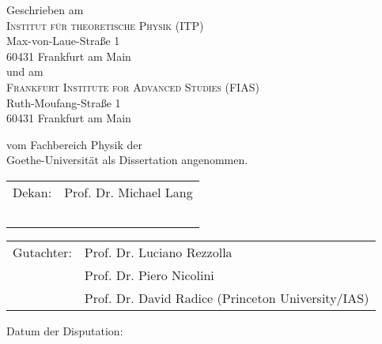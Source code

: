 	\noindent
	Geschrieben am \\[.3cm]
	
	\noindent
	\textsc{Institut für theoretische Physik (ITP)} \\
	Max-von-Laue-Straße 1 \\
	60431 Frankfurt am Main \\[.3cm]
	
	\noindent
	und am \\[.3cm]
	
	\noindent
	\textsc{Frankfurt Institute for Advanced Studies (FIAS)} \\
	Ruth-Moufang-Straße 1 \\
	60431 Frankfurt am Main
	
	\vfill
	
	\noindent{}%
	vom Fachbereich Physik der \\[2pt]
	Goethe-Universit\"at als Dissertation angenommen.
	
	\vspace*{2cm}
	
	\noindent{}%
	\begin{tabular}{@{}l@{\hskip 1ex}l}
		Dekan: & Prof. Dr. Michael Lang\\
		\phantom{Gutachter:}&~
	\end{tabular}
	
	
	\noindent{}%
	\begin{tabular}{@{}l@{\hskip 1ex}l}
		Gutachter: & Prof. Dr. Luciano Rezzolla\\
		& Prof. Dr. Piero Nicolini \\
		& Prof. Dr. David Radice (Princeton University/IAS)
	\end{tabular}
	
	\vspace*{2cm}
	\noindent{}%
	Datum der Disputation:
	\vspace*{2cm}
	\normalsize  %
	
\newpage

